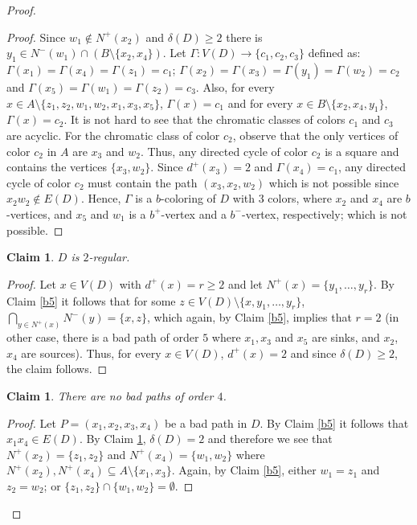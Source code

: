 \documentclass[12pt]{article}
\newtheorem{claim}[theorem]{Claim}
\begin{document}
\begin{proof}
\begin{proof}
\noindent  Since $w_1 \not \in N^+(x_2)$ and  $\delta(D) \geq 2$ there is $y_1\in N^-(w_1)\cap (B\setminus \{x_2, x_4\})$. 
Let $\Gamma: V(D) \rightarrow \{c_1, c_2, c_3\}$ defined as: $\Gamma(x_1) =\Gamma(x_4) = \Gamma(z_1) = c_1$; $\Gamma(x_2)  = \Gamma(x_3)  = \Gamma(y_1) =\Gamma(w_2) =  c_2$ and $\Gamma(x_5) = \Gamma(w_1) = \Gamma(z_2) = c_3$. Also, for every $x\in A\setminus\{z_1, z_2, w_1, w_2, x_1, x_3, x_5\}$, $\Gamma(x) = c_1$ and for every $x\in B\setminus\{x_2, x_4, y_1\}$, $\Gamma(x) = c_2$. It is not hard to see that the chromatic classes of colors $c_1$ and $c_3$ are acyclic. For the chromatic class of color $c_2$, observe that the only vertices of color $c_2$ in $A$ are $x_3$ and $w_2$. Thus, any directed cycle of color $c_2$ is a square and contains the vertices $\{x_3, w_2\}$. Since $d^+(x_3)= 2$ and $\Gamma (x_4)= c_1$, any directed cycle of color $c_2$ must contain the path $(x_3, x_2, w_2)$ which is not possible since $x_2w_2\not\in E(D)$. Hence, $\Gamma$ is a $b$-coloring of $D$ with 3 colors, where $x_2$ and $x_4$ are  $b$-vertices, and $x_5$ and $w_1$ is a $b^+$-vertex and a $b^-$-vertex, respectively; which is not possible.
\end{proof}

\begin{claim}\label{2reg} $D$ is $2$-regular.
\end{claim}
\begin{proof} Let $x\in V(D)$ with $d^+(x) =r\geq 2$ and let $N^+(x) = \{y_1, \dots, y_r\}$. By Claim \ref{b5} it follows that for some $z\in V(D)\setminus \{x, y_1, \dots, y_r\}$,  $\bigcap\limits_{y\in N^+(x)} N^-(y) = \{x, z\}$, which again, by Claim \ref{b5}, implies that $r=2$ (in other case, there is a bad path of order $5$ where $x_1, x_3$ and $x_5$ are sinks, and $x_2$, $x_4$ are sources). Thus, for every $x\in V(D)$, $d^+(x) =2$ and since $\delta(D) \geq 2$, the claim follows.
\end{proof}

\begin{claim}\label{b4} There are no bad paths of order $4$.
\end{claim}
\begin{proof}
Let $P=(x_1, x_2, x_3, x_4)$ be a bad path in $D$. By Claim \ref{b5} it follows that $x_1x_4\in E(D)$. By Claim \ref{2reg}, $\delta(D) = 2$ and therefore we see that $N^+(x_2) = \{z_1, z_2\}$ and $N^+(x_4) = \{w_1, w_2\}$ where $N^+(x_2), N^+(x_4) \subseteq A\setminus\{x_1, x_3\}$. Again, by Claim \ref{b5}, either $w_1= z_1$ and $z_2=w_2$;  or $\{z_1, z_2\}\cap \{w_1, w_2\}=\emptyset$. 


\end{proof}
\end{proof}
\end{document}
